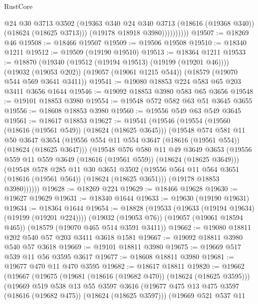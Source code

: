 \begin{lexlean}{RustCore}
\begin{coremodule}
                      @24
                      @30
                      @3713
                      @3502
                      (@19363 @340 @24 @340 @3713 (@18616 (@19368 @340)) (@18624 (@18625 @3713)))
                      (@19178 @18918 @3980))))))))))
@19507 := @18269 @46
@19508 := @18466 @19507
@19509 := @19506 @19508
@19510 := @18340 @1211
@19512 := @19509 (@19190 @19510)
@19513 := @18364 @1211
@19533 := @18870
    (@19340 (@19512 (@19194 @19513) (@19199 (@19201 @46))))
    (@19032 (@19053 @202))
    (@19057 (@19061 @1215 @544))
    (@18579 (@19070 @544 @569 @3641 @3411))
@19541 := @19080 @18853 @224 @583 @65 @203 @3411 @3656 @1644
@19546 := @19092 @18853 @3980 @583 @65 @3656
@19548 := @19101 @18853 @3980
@19554 := @19548 @572 @582 @63 @51 @3645 @3655
@19556 := @18608 @18853 @3980
@19560 := @19556 @549 @63 @549 @3645
@19561 := @18617 @18853
@19627 := @19541
    (@19546
      (@19554
        (@19560 (@18616 (@19561 @549)) (@18624 (@18625 @3645)))
        (@19548
          @574
          @581
          @11
          @50
          @3647
          @3654
          (@19556 @554 @11 @554 @3647 (@18616 (@19561 @554)) (@18624 (@18625 @3647)))
          (@19548
            @576
            @580
            @11
            @49
            @3649
            @3653
            (@19556 @559 @11 @559 @3649 (@18616 (@19561 @559)) (@18624 (@18625 @3649)))
            (@19548
              @578
              @285
              @11
              @30
              @3651
              @3502
              (@19556 @564 @11 @564 @3651 (@18616 (@19561 @564)) (@18624 (@18625 @3651)))
              (@19178 @18853 @3980))))))
@19628 := @18269 @224
@19629 := @18466 @19628
@19630 := @19627 @19629
@19631 := @18340 @1644
@19633 := @19630 (@19190 @19631)
@19634 := @18364 @1644
@19654 := @18828
    (@19533 (@19633 (@19194 @19634) (@19199 (@19201 @224))))
    (@19032 (@19053 @76))
    (@19057 (@19061 @18594 @465))
    (@18579 (@19070 @465 @514 @3591 @3411))
@19662 := @19080 @18811 @202 @540 @57 @203 @3411 @3618 @1581
@19667 := @19092 @18811 @3980 @540 @57 @3618
@19669 := @19101 @18811 @3980
@19675 := @19669 @517 @539 @11 @56 @3595 @3617
@19677 := @18608 @18811 @3980
@19681 := @19677 @470 @11 @470 @3595
@19682 := @18617 @18811
@19820 := @19662
    (@19667
      (@19675
        (@19681 (@18616 (@19682 @470)) (@18624 (@18625 @3595)))
        (@19669
          @519
          @538
          @13
          @55
          @3597
          @3616
          (@19677 @475 @13 @475 @3597 (@18616 (@19682 @475)) (@18624 (@18625 @3597)))
          (@19669
            @521
            @537
            @11

\end{coremodule}
\end{lexlean}
